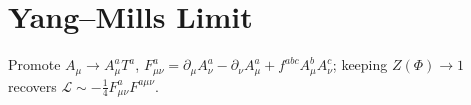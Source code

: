 \section*{Yang--Mills Limit} Promote $A_\mu\to A_\mu^a T^a$, $F_{\mu\nu}^a = \partial_\mu A_\nu^a-\partial_\nu A_\mu^a + f^{abc}A_\mu^b A_\nu^c$; keeping $Z(\Phi)\!\to\!1$ recovers $\mathcal L\sim -\tfrac14 F_{\mu\nu}^aF^{a\mu\nu}$.
